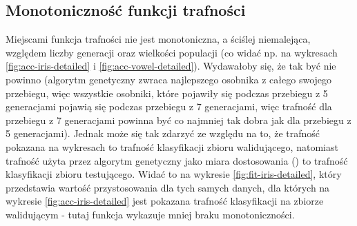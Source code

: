 %	
%	
%	

\FloatBarrier
	\subsection{Monotoniczność funkcji trafności}	
	Miejscami funkcja trafności nie jest monotoniczna, a ściślej niemalejąca, względem liczby generacji oraz wielkości populacji (co widać np. na wykresach \ref{fig:acc-iris-detailed} i \ref{fig:acc-vowel-detailed}). Wydawałoby się, że tak być nie powinno (algorytm genetyczny zwraca najlepszego osobnika z całego swojego przebiegu, więc wszystkie osobniki, które pojawiły się podczas przebiegu z 5 generacjami pojawią się podczas przebiegu z 7 generacjami, więc trafność dla przebiegu z 7 generacjami powinna być co najmniej tak dobra jak dla przebiegu z 5 generacjami). Jednak może się tak zdarzyć ze względu na to, że trafność pokazana na wykresach to trafność klasyfikacji zbioru walidującego, natomiast trafność użyta przez algorytm genetyczny jako miara dostosowania () to trafność klasyfikacji zbioru testującego. Widać to na wykresie \ref{fig:fit-iris-detailed}, który przedstawia wartość przystosowania dla tych samych danych, dla których na wykresie \ref{fig:acc-iris-detailed} jest pokazana trafność klasyfikacji na zbiorze walidującym - tutaj funkcja wykazuje mniej braku monotoniczności. 

